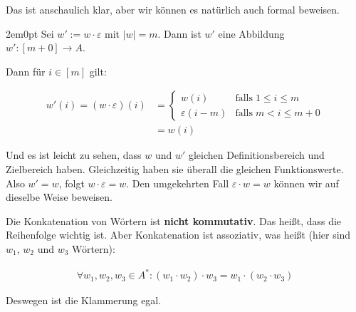 \documentclass[12pt,a4paper,oneside]{article}
\newcommand{\emptyline}{\hspace*{\fill}}
\newcommand{\If}[1]{\text{falls}\; #1}
\begin{document}
            Das ist anschaulich klar, aber wir können es natürlich auch formal beweisen.

            \emptyline

            \begin{adjustwidth}{2em}{0pt}
                Sei $w' := w \cdot \varepsilon$ mit $|w| = m$.
                Dann ist $w'$ eine Abbildung $w': [m + 0] \to A$.

                \emptyline

                Dann für $i \in [m]$ gilt:

                \vspace{-1em}
                \begin{align*}
                    w'(i) = (w \cdot \varepsilon)(i) &=
                    \begin{cases}
                                      w(i) &\If{1 \leq i \leq m} \\
                        \varepsilon(i - m) &\If{m < i \leq m + 0}
                    \end{cases} \\
                                                     &= w(i)
                \end{align*}

                Und es ist leicht zu sehen, dass $w$ und $w'$ gleichen Definitionsbereich und Zielbereich haben.
                Gleichzeitig haben sie überall die gleichen Funktionswerte.
                Also $w' = w$, folgt $w \cdot \varepsilon = w$.
                Den umgekehrten Fall $\varepsilon \cdot w = w$ können wir auf dieselbe Weise beweisen.
            \end{adjustwidth}

            \emptyline

            Die Konkatenation von Wörtern ist \textbf{nicht kommutativ}.
            Das heißt, dass die Reihenfolge wichtig ist.
            Aber Konkatenation ist assoziativ, was heißt (hier sind $w_1$, $w_2$ und $w_3$ Wörtern):

            \vspace{-1em}
            \begin{align*}
                \forall w_1, w_2, w_3 \in A^*: (w_1 \cdot w_2) \cdot w_3 = w_1 \cdot (w_2 \cdot w_3)
            \end{align*}

            Deswegen ist die Klammerung egal.

            \emptyline
\end{document}
